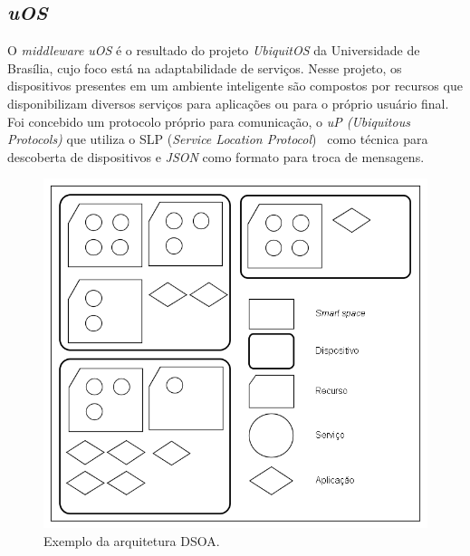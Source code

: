 \subsection{\emph{uOS}}
\label{subsec:introUos}

O \emph{middleware} \emph{uOS} é o resultado do projeto \emph{UbiquitOS} da Universidade de Brasília, cujo foco está na adaptabilidade de serviços. Nesse projeto, os dispositivos presentes em um ambiente inteligente são compostos por recursos que disponibilizam diversos serviços para aplicações ou para o próprio usuário final. Foi concebido um protocolo próprio para comunicação, o \emph{uP (Ubiquitous Protocols)} que utiliza o SLP (\emph{Service Location Protocol})~\cite{Guttman:1999:SLP:613337.613425} como técnica para descoberta de dispositivos e \emph{JSON} como formato para troca de mensagens.

\begin{figure}[ht]
	\center
	\includegraphics[scale=0.5]{imagens/arquiteturaDSOA}
	\caption{Exemplo da arquitetura DSOA.}
	\label{fig:arquiteturaDSOA}
\end{figure}

